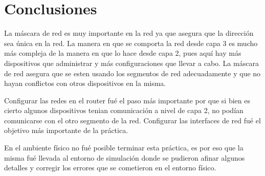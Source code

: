 \section*{Conclusiones}
{
    \hspace{0.5cm} La m\'ascara de red es muy importante en la red ya que asegura que la direcci\'on sea \'unica en la red.
    La manera en que se comporta la red desde capa 3 es mucho m\'as compleja de la manera en que lo hace desde capa 2, pues 
    aqu\'i hay m\'as dispositivos que administrar y m\'as configuraciones que llevar a cabo. La m\'ascara de red asegura que 
    se esten usando los segmentos de red adecuadamente y que no hayan conflictos con otros dispositivos en la misma.\newline

    \hspace{0.5cm} Configurar las redes en el router fu\'e el paso m\'as importante por que si bien es cierto algunos dispositivos
    tenian comunicaci\'on a nivel de capa 2, no pod\'ian comunicarse con el otro segmento de la red. Configurar las interfaces de red
    fu\'e el objetivo m\'as importante de la pr\'actica.\newline

    \hspace{0.5cm} En el ambiente f\'isico no fu\'e posible terminar esta pr\'actica, es por eso que la misma fu\'e llevada al entorno
    de simulaci\'on donde se pudieron afinar algunos detalles y corregir los errores que se cometieron en el entorno f\'isico.
}

